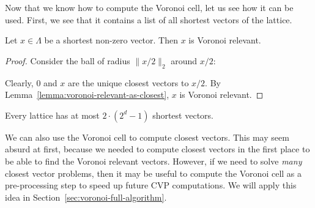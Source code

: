 Now that we know how to compute the Voronoi cell,
let us see how it can be used.
First, we see that it contains a list of all shortest vectors of the lattice.

\begin{lemma}
  Let $x \in \Lambda$ be a shortest non-zero vector.
  Then $x$ is Voronoi relevant.
\end{lemma}
\begin{proof}
  Consider the ball of radius $\|x/2\|_2$ around $x/2$:
  \begin{center}
  \end{center}
  Clearly, $0$ and $x$ are the unique closest vectors to $x/2$.
  By Lemma~\ref{lemma:voronoi-relevant-as-closest}, $x$ is Voronoi relevant.
\end{proof}

\begin{corollary}
  Every lattice has at most $2 \cdot (2^d - 1)$ shortest vectors.
\end{corollary}

We can also use the Voronoi cell to compute closest vectors.
This may seem absurd at first,
because we needed to compute closest vectors in the first place to be able to
find the Voronoi relevant vectors.
However, if we need to solve \emph{many} closest vector problems,
then it may be useful to compute the Voronoi cell as a pre-processing step
to speed up future CVP computations.
We will apply this idea in Section~\ref{sec:voronoi-full-algorithm}.

